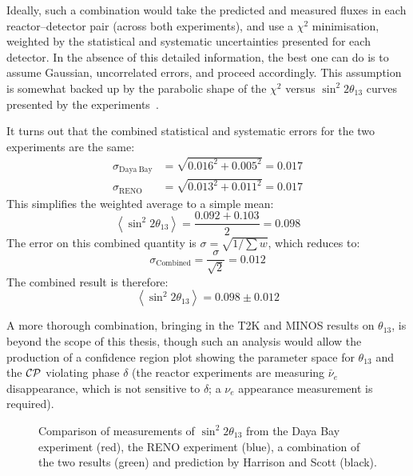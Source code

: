 Ideally, such a combination would take the predicted and measured fluxes in each reactor--detector pair (across both experiments), and use a $\chi^2$ minimisation, weighted by the statistical and systematic uncertainties presented for each detector. In the absence of this detailed information, the best one can do is to assume Gaussian, uncorrelated errors, and proceed accordingly. This assumption is somewhat backed up by the parabolic shape of the $\chi^2$ versus $\sin^2 2\theta_{13}$ curves presented by the experiments~\citep{An2012, Ahn2012}.

It turns out that the combined statistical and systematic errors for the two experiments are the same:
\begin{align}
\sigma_{\mathrm{Daya~Bay}} & = \sqrt{0.016^2 + 0.005^2} = 0.017 \\
\sigma_{\mathrm{RENO}} & = \sqrt{0.013^2 + 0.011^2} = 0.017 \nonumber
\end{align}
This simplifies the weighted average to a simple mean:
\begin{equation}
\left<\sin^2 2\theta_{13}\right> = \frac{0.092 + 0.103}{2} = 0.098
\end{equation}
The error on this combined quantity is $\sigma = \sqrt{1 / \sum w}$, which reduces to:
\begin{equation}
\sigma_{\mathrm{Combined}} = \frac{\sigma}{\sqrt{2}} = 0.012
\end{equation}
The combined result is therefore:
\begin{equation}\label{eqn:theta_13_combined}
\left<\sin^2 2\theta_{13}\right> = 0.098 \pm 0.012
\end{equation}

A more thorough combination, bringing in the T2K and MINOS results on $\theta_{13}$, is beyond the scope of this thesis, though such an analysis would allow the production of a confidence region plot showing the parameter space for $\theta_{13}$ and the $\mathcal{C}\mathcal{P}$ violating phase $\delta$ (the reactor experiments are measuring $\bar{\nu}_e$ disappearance, which is not sensitive to $\delta$; a $\nu_e$ appearance measurement is required).

\begin{figure}
\centering
{}
\caption[Comparison of measurements of $\sin^2 2\theta_{13}$]{\label{fig:theta-13_results}Comparison of measurements of $\sin^2 2\theta_{13}$ from the Daya Bay experiment (red), the RENO experiment (blue), a combination of the two results (green) and prediction by Harrison and Scott (black).}
\end{figure}

